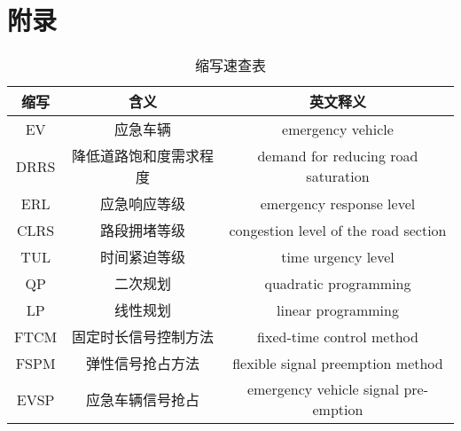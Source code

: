 \chapter*{附录}

\begin{table}[H]
	\centering
	\caption{缩写速查表}
	\label{table:abbreviations}
	\begin{tabular}{|c|c|c|}
		\hline
		缩写 & 含义 & 英文释义 \\ \hline
		EV	 &	应急车辆	  &	emergency vehicle \\ \hline
		DRRS &	降低道路饱和度需求程度	&	demand for reducing road saturation  \\ \hline
		ERL  &  应急响应等级	& emergency response level  \\ \hline
		CLRS &  路段拥堵等级	& congestion level of the road section  \\ \hline
		TUL  &  时间紧迫等级	& time urgency level    \\ \hline
		QP   &  二次规划	  & quadratic programming \\ \hline
		LP   &  线性规划 	  & linear programming \\ \hline
		FTCM &  固定时长信号控制方法 & fixed-time control method \\ \hline
		FSPM &  弹性信号抢占方法 & flexible signal preemption method\cite{min} \\ \hline
		EVSP &  应急车辆信号抢占 & emergency vehicle signal pre-emption\cite{qin_control_2012} \\ \hline
	\end{tabular}
\end{table}

